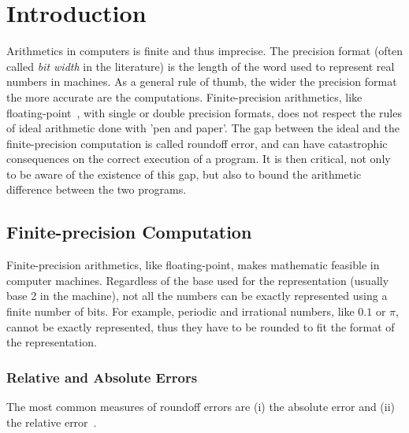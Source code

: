 
\chapter{Introduction}

\setupuuchapterbib

Arithmetics in computers is finite and thus imprecise.
%
The precision format (often called \emph{bit width} in the literature) is the length of the word used to represent real numbers in machines.
%
As a general rule of thumb, the wider the precision format the more accurate are the computations.
%
Finite-precision arithmetics, like floating-point~\cite{ieee754}, with single or double precision formats, does not respect the rules of ideal arithmetic done with 'pen and paper'. 
%
The gap between the ideal and the finite-precision computation is called roundoff error, and can have catastrophic consequences on the correct execution of a program.
%
It is then critical, not only to be aware of the existence of this gap, but also to bound the arithmetic difference between the two programs.
%
\section{Finite-precision Computation}
%

Finite-precision arithmetics, like floating-point, makes mathematic feasible in computer machines. 
%
Regardless of the base used for the representation (usually base 2 in the machine), not all the numbers can be exactly represented using a finite number of bits.
%
For example, periodic and irrational numbers, like $0.1$ or $\pi$, cannot be exactly represented, thus they have to be rounded to fit the format of the representation. 
%
%
\subsection{Relative and Absolute Errors}
%
The most common measures of roundoff errors are (i) the absolute error and (ii) the relative error~\cite{higham2002accuracy}.
%


